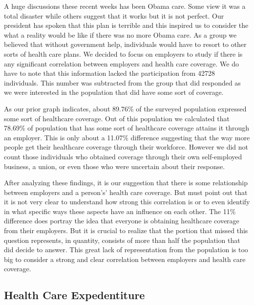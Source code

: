 \documentclass[10pt,]{article}
\begin{document}
A huge discussions these recent weeks has been Obama care. Some view it
was a total disaster while others suggest that it works but it is not
perfect. Our president has spoken that this plan is terrible and this
inspired us to consider the what a reality would be like if there was no
more Obama care. As a group we believed that without government help,
individuals would have to resort to other sorts of health care plans. We
decided to focus on employers to study if there is any significant
correlation between employers and health care coverage. We do have to
note that this information lacked the participation from 42728
individuals. This number was subtracted from the group that did
responded as we were interested in the population that did have some
sort of coverage.

As our prior graph indicates, about 89.76\% of the surveyed population
expressed some sort of healthcare coverage. Out of this population we
calculated that 78.69\% of population that has some sort of healthcare
coverage attains it through an employer. This is only about a 11.07\%
difference suggesting that the way more people get their healthcare
coverage through their workforce. However we did not count those
individuals who obtained coverage through their own self-employed
business, a union, or even those who were uncertain about their
response.

After analyzing these findings, it is our suggestion that there is some
relationship between employers and a person's' health care coverage. But
must point out that it is not very clear to understand how strong this
correlation is or to even identify in what specific ways these aspects
have an influence on each other. The 11\% difference does portray the
idea that everyone is obtaining healthcare coverage from their
employers. But it is crucial to realize that the portion that missed
this question represents, in quantity, consists of more than half the
population that did decide to answer. This great lack of representation
from the population is too big to consider a strong and clear
correlation between employers and health care coverage.

\subsection{\texorpdfstring{\textbf{Health Care
Expedentiture}}{Health Care Expedentiture}}\label{health-care-expedentiture-1}
\end{document}
